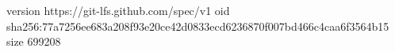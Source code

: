 version https://git-lfs.github.com/spec/v1
oid sha256:77a7256ee683a208f93e20ce42d0833ecd6236870f007bd466c4caa6f3564b15
size 699208
